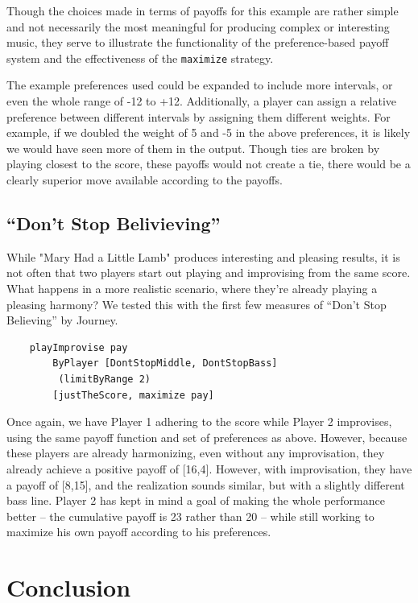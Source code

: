 \documentclass{article}
\begin{document}
Though the choices made in terms of payoffs for this example are rather
simple and not necessarily the most meaningful for producing complex or
interesting music, they serve to illustrate the functionality of the
preference-based payoff system and the effectiveness of the \texttt{maximize}
strategy.

The example preferences used could be expanded to include more intervals, or even
the whole range of -12 to +12.  Additionally, a player can assign a relative
preference between different intervals by assigning them different weights.  
For example, if we doubled the weight of 5 and -5 in
the above preferences, it is likely we would have seen more of them in the
output. Though ties are broken by playing closest to the score, these
payoffs would not create a tie, there would be a clearly superior move
available according to the payoffs.

\subsection{``Don't Stop Belivieving''}

While "Mary Had a Little Lamb" produces interesting and pleasing results,
it is not often that two players start out playing and improvising from
the same score. What happens in a more realistic scenario, where they're
already playing a pleasing harmony? We tested this with the first few
measures of ``Don't Stop Believing'' by Journey.

\begin{verbatim}
    playImprovise pay 
        ByPlayer [DontStopMiddle, DontStopBass]
         (limitByRange 2) 
        [justTheScore, maximize pay]
\end{verbatim}

Once again, we have Player 1 adhering to the score while Player 2
improvises, using the same payoff function and set of preferences as
above. However, because these players are already harmonizing, 
even without any improvisation, they already achieve a positive payoff
of {[}16,4{]}.  However, with improvisation, they
have a payoff of {[}8,15{]}, and the realization sounds similar, but
with a slightly different bass line. Player 2 has kept in mind
a goal of making the whole performance better -- the cumulative payoff is 23
rather than 20 -- while still working to maximize his own payoff according to his preferences.

\section{Conclusion}
\end{document}
